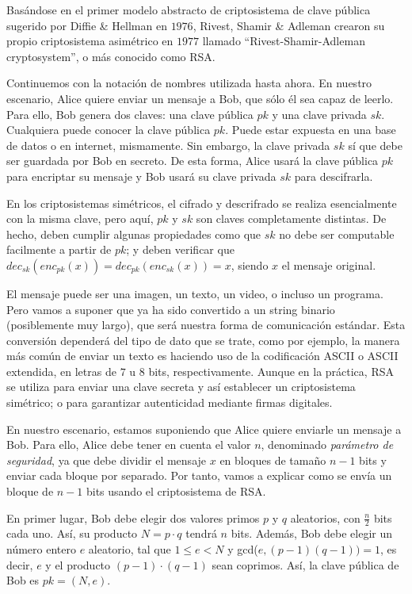    Basándose en el primer modelo abstracto de criptosistema de clave pública sugerido por Diffie \& Hellman en $1976$, Rivest, Shamir \& Adleman crearon su propio criptosistema asimétrico en $1977$ llamado ``Rivest-Shamir-Adleman cryptosystem'', o más conocido como RSA.

    Continuemos con la notación de nombres utilizada hasta ahora. En nuestro escenario, Alice quiere enviar un mensaje a Bob, que sólo él sea capaz de leerlo. Para ello, Bob genera dos claves: una clave pública $pk$ y una clave privada $sk$. Cualquiera puede conocer la clave pública $pk$. Puede estar expuesta en una base de datos o en internet, mismamente. Sin embargo, la clave privada $sk$ sí que debe ser guardada por Bob en secreto. De esta forma, Alice usará la clave pública $pk$ para encriptar su mensaje y Bob usará su clave privada $sk$ para descifrarla.

    En los criptosistemas simétricos, el cifrado y descrifrado se realiza esencialmente con la misma clave, pero aquí, $pk$ y $sk$ son claves completamente distintas. De hecho, deben cumplir algunas propiedades como que $sk$ no debe ser computable facilmente a partir de $pk$; y deben verificar que $dec_{sk}(enc_{pk}(x)) = dec_{pk}(enc_{sk}(x)) = x$, siendo $x$ el mensaje original.

    El mensaje puede ser una imagen, un texto, un video, o incluso un programa. Pero vamos a suponer que ya ha sido convertido a un string binario (posiblemente muy largo), que será nuestra forma de comunicación estándar. Esta conversión dependerá del tipo de dato que se trate, como por ejemplo, la manera más común de enviar un texto es haciendo uso de la codificación ASCII o ASCII extendida, en letras de $7$ u $8$ bits, respectivamente. Aunque en la práctica, RSA se utiliza para enviar una clave secreta y así establecer un criptosistema simétrico; o para garantizar autenticidad mediante firmas digitales. 

    En nuestro escenario, estamos suponiendo que Alice quiere enviarle un mensaje a Bob. Para ello, Alice debe tener en cuenta el valor $n$, denominado \textit{parámetro de seguridad}, ya que debe dividir el mensaje $x$ en bloques de tamaño $n-1$ bits y enviar cada bloque por separado. Por tanto, vamos a explicar como se envía un bloque de $n-1$ bits usando el criptosistema de RSA.

    En primer lugar, Bob debe elegir dos valores primos $p$ y $q$ aleatorios, con $\frac{n}{2}$ bits cada uno. Así, su producto $N = p \cdot q$ tendrá $n$ bits. Además, Bob debe elegir un número entero $e$ aleatorio, tal que $1 \leq e < N$ y gcd($e, (p-1)(q - 1)) = 1$, es decir, $e$ y el producto $(p-1) \cdot (q-1)$ sean coprimos. Así, la clave pública de Bob es $pk = (N, e)$. 

